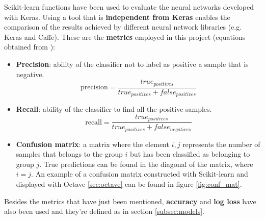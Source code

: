 Scikit-learn functions have been used to evaluate the neural networks developed with Keras. Using a tool that is \textbf{independent from Keras} enables the comparison of the results achieved by different neural network libraries (e.g. Keras and Caffe). These are the \textbf{metrics} employed in this project (equations obtained from \cite{scikit-doc}):
\begin{itemize}
	\item \textbf{Precision}: ability of the classifier not to label as positive a sample that is negative.
	\begin{equation}\label{eq:precision}
	\textrm{precision}=\frac{true_{positives}}{true_{positives}+false_{positives}}
	\end{equation}
	
	\item \textbf{Recall}: ability of the classifier to find all the positive samples.
	\begin{equation}\label{eq:recall}
	\textrm{recall}=\frac{true_{positives}}{true_{positives}+false_{negatives}}
	\end{equation}
	
	\item \textbf{Confusion matrix}: a matrix where the element $i,j$ represents the number of samples that belongs to the group $i$ but has been classified as belonging to group $j$. True predictions can be found in the diagonal of the matrix, where $i=j$. An example of a confusion matrix constructed with Scikit-learn and displayed with Octave \ref{sec:octave} can be found in figure \ref{fig:conf_mat}.
\end{itemize}

Besides the metrics that have just been mentioned, \textbf{accuracy} and \textbf{log loss} have also been used and they're defined as in section \ref{subsec:models}.

